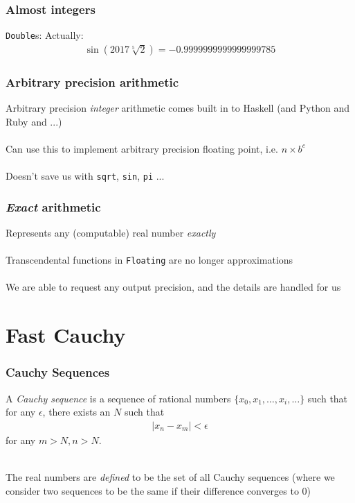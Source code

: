 \documentclass[11pt,aspectratio=169]{beamer}
\begin{document}
\begin{frame}
\frametitle{Almost integers}
\texttt{Double}s:
\pause
Actually:
\begin{align*}
\sin(2017 \sqrt[5]{2}) = -0.9999999999999999785
\end{align*}
\end{frame}

\begin{frame}
\frametitle{Arbitrary precision arithmetic}
Arbitrary precision \emph{integer} arithmetic comes built in to
Haskell (and Python and Ruby and ...)
\\~\\
Can use this to implement arbitrary precision floating point, i.e. $n
\times b^c$
\\~\\
Doesn't save us with \texttt{sqrt}, \texttt{sin}, \texttt{pi} ...
\end{frame}

\begin{frame}
\frametitle{\emph{Exact} arithmetic}
Represents any (computable) real number \emph{exactly}
\\~\\
Transcendental functions in \texttt{Floating} are no longer approximations
\\~\\
We are able to request any output precision, and the details are
handled for us
\end{frame}

\section{Fast Cauchy}

\begin{frame}
\frametitle{Cauchy Sequences}
\begin{definition}
A \emph{Cauchy sequence} is a sequence of rational numbers $\{x_0, x_1, \dots, x_i, \dots\}$
such that for any $\epsilon$, there exists an $N$ such that
\begin{align*}
\vert x_n - x_m \vert < \epsilon
\end{align*}
for any $m > N, n > N$.
\end{definition}
~\\
The real numbers are \emph{defined} to be the set of all Cauchy
sequences (where we consider two sequences to be the same if their
difference converges to $0$)
\end{frame}
\end{document}
